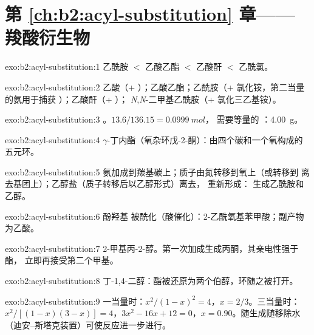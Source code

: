 \section*{第 \ref{ch:b2:acyl-substitution} 章——羧酸衍生物}

\begin{solution}{exo:b2:acyl-substitution:1}
乙酰胺 $<$ 乙酸乙酯 $<$ 乙酸酐 $<$ 乙酰氯。
\end{solution}

\begin{solution}{exo:b2:acyl-substitution:2}
乙酸（+ ）；乙酸乙酯；乙酰胺（+ 氯化铵，第二当量的氨用于捕获
）；乙酸酐（+ ）；
\textit{N},\textit{N}-二甲基乙酰胺（+ 氯化三乙基铵）。
\end{solution}

\begin{solution}{exo:b2:acyl-substitution:3}
。$13.6/136.15 = \qty{0.0999}{mol}$，
需要等量的 ：\qty{4.00}{g}。
\end{solution}

\begin{solution}{exo:b2:acyl-substitution:4}
$\gamma$-丁内酯（氧杂环戊-2-酮）：由四个碳和一个氧构成的五元环。
\end{solution}

\begin{solution}{exo:b2:acyl-substitution:5}
氨加成到羰基碳上；质子由氮转移到氧上（或转移到
离去基团上）；乙醇盐（质子转移后以乙醇形式）离去， 重新形成：
生成乙酰胺和乙醇。
\end{solution}

\begin{solution}{exo:b2:acyl-substitution:6}
酚羟基  被酰化（酸催化）：2-乙酰氧基苯甲酸；副产物为乙酸。
\end{solution}

\begin{solution}{exo:b2:acyl-substitution:7}
2-甲基丙-2-醇。第一次加成生成丙酮，其亲电性强于酯，
立即再接受第二个甲基。
\end{solution}

\begin{solution}{exo:b2:acyl-substitution:8}
丁-1,4-二醇：酯被还原为两个伯醇，环随之被打开。
\end{solution}

\begin{solution}{exo:b2:acyl-substitution:9}
一当量时：$x^2/(1 - x)^2 = 4$，$x = 2/3$。三当量时：$x^2/[(1 - x)(3 - x)] = 4$，$3x^2 - 16x
+ 12 = 0$，$x = 0.90$。随生成随移除水（迪安–斯塔克装置）可使反应进一步进行。
\end{solution}

